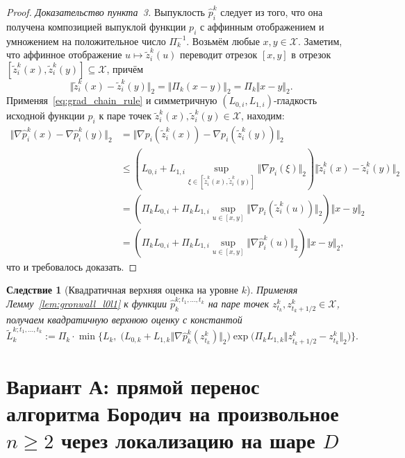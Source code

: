 \documentclass[11pt, a4paper]{article}
\newtheorem{corollary}{Следствие}[section]
\theoremstyle{definition}
\begin{document}
\begin{proof}
\emph{Доказательство пункта~3.} Выпуклость $\hat{p}_i^k$ следует из того, что она получена композицией выпуклой функции $p_i$ с аффинным отображением и умножением на положительное число $\Pi_k^{-1}$. Возьмём любые $x, y \in \mathcal{X}$. Заметим, что аффинное отображение $u \mapsto \tilde{z}_i^k(u)$ переводит отрезок $[x, y]$ в отрезок $[\tilde{z}_i^k(x), \tilde{z}_i^k(y)] \subseteq \mathcal{X}$, причём
\[
\Vert \tilde{z}_i^k(x) - \tilde{z}_i^k(y) \Vert_2 = \Vert \Pi_k (x - y) \Vert_2 = \Pi_k \Vert x - y \Vert_2.
\]
Применяя~\eqref{eq:grad_chain_rule} и симметричную $(L_{0,i}, L_{1,i})$-гладкость исходной функции $p_i$ к паре точек $\tilde{z}_i^k(x), \tilde{z}_i^k(y) \in \mathcal{X}$, находим:
\begin{align*}
\Vert \nabla \hat{p}_i^k(x) - \nabla \hat{p}_i^k(y) \Vert_2 &= \Vert \nabla p_i(\tilde{z}_i^k(x)) - \nabla p_i(\tilde{z}_i^k(y)) \Vert_2 \\
&\le \left(L_{0,i} + L_{1,i} \sup_{\xi \in [\tilde{z}_i^k(x), \tilde{z}_i^k(y)]} \Vert \nabla p_i(\xi) \Vert_2\right) \Vert \tilde{z}_i^k(x) - \tilde{z}_i^k(y) \Vert_2 \\
&= \left(\Pi_k L_{0,i} + \Pi_k L_{1,i} \sup_{u \in [x, y]} \Vert \nabla p_i(\tilde{z}_i^k(u)) \Vert_2\right) \Vert x - y \Vert_2 \\
&= \left(\Pi_k L_{0,i} + \Pi_k L_{1,i} \sup_{u \in [x, y]} \Vert \nabla \hat{p}_i^k(u) \Vert_2\right) \Vert x - y \Vert_2,
\end{align*}
что и требовалось доказать.
\end{proof}

\begin{corollary}[Квадратичная верхняя оценка на уровне $k$]\label{cor:level_k_quad}
Применяя Лемму~\ref{lem:gronwall_l0l1} к функции $\hat{p}_k^{k; t_1, \dots, t_k}$ на паре точек $z_{t_k}^k, z_{t_k + 1/2}^k \in \mathcal{X}$, получаем квадратичную верхнюю оценку с константой
\begin{equation}\label{eq:tilde_L_k}
\widetilde{L}_k^{k; t_1, \dots, t_k} := \Pi_k \cdot \min\Big\{L_k,\; \big(L_{0,k} + L_{1,k} \Vert \nabla \hat{p}_k^k(z_{t_k}^k) \Vert_2\big) \exp\big(\Pi_k L_{1,k} \Vert z_{t_k + 1/2}^k - z_{t_k}^k \Vert_2\big)\Big\}.
\end{equation}
\end{corollary}

\section{Вариант А: прямой перенос алгоритма Бородич на произвольное $n \ge 2$ через локализацию на шаре $D$}
\end{document}
